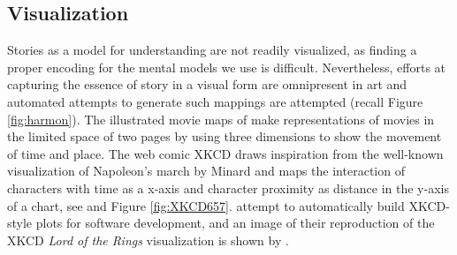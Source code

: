 {%



\subsection{Visualization}

Stories as a model for understanding are not readily visualized, as finding a proper encoding for the mental models we use is difficult.
Nevertheless, efforts at capturing the essence of story in a visual form are omnipresent in art and automated attempts to generate such mappings are attempted (recall Figure \ref{fig:harmon}).
The illustrated movie maps of \cite{degraff2015plotted} make representations of movies in the limited space of two pages by using three dimensions to show the movement of time and place.
The web comic XKCD draws inspiration from the well-known visualization of Napoleon's march by Minard and maps the interaction of characters with time as a x-axis and character proximity as distance in the y-axis of a chart, see \cite{munroe657} and Figure \ref{fig:XKCD657}.
\cite{ogawa2010software} attempt to automatically build XKCD-style plots for software development, and an image of their reproduction of the XKCD \textit{Lord of the Rings} visualization is shown by \cite{cao2016introduction}.

}
